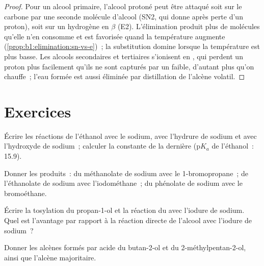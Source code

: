 \begin{proof}
Pour un alcool primaire, l'alcool protoné peut être attaqué soit sur le
carbone par une seconde molécule d'alcool (SN2, qui donne 
après perte d'un proton), soit sur un hydrogène en $\beta$ (E2).
L'élimination produit plus de molécules qu'elle n'en consomme et est
favorisée quand la température augmente
(\cref{prop:b1:elimination:sn-vs-e})~; la substitution domine lorsque la
température est plus basse. Les alcools secondaires et tertiaires
s'ionisent en , qui perdent un proton plus facilement qu'ils
ne sont capturés par un  faible, d'autant plus qu'on chauffe~;
l'eau formée est aussi éliminée par distillation de l'alcène volatil.
\end{proof}

\section{Exercices}

\begin{exercise}[$\star$]\label{exo:b1:alcohol-activation:1}
Écrire les réactions de l'éthanol avec le sodium, avec l'hydrure de
sodium et avec l'hydroxyde de sodium~; calculer la constante de la
dernière ($\mathrm{p}K_a$ de l'éthanol~: 15.9).
\end{exercise}

\begin{exercise}[$\star$]\label{exo:b1:alcohol-activation:2}
Donner les produits~: du méthanolate de sodium avec le 1-bromopropane~;
de l'éthanolate de sodium avec l'iodométhane~; du phénolate de sodium
avec le bromoéthane.
\end{exercise}

\begin{exercise}[$\star$]\label{exo:b1:alcohol-activation:3}
Écrire la tosylation du propan-1-ol et la réaction du  avec
l'iodure de sodium. Quel est l'avantage par rapport à la réaction
directe de l'alcool avec l'iodure de sodium~?
\end{exercise}

\begin{exercise}[$\star$]\label{exo:b1:alcohol-activation:4}
Donner les alcènes formés par  acide du butan-2-ol et du
2-méthylpentan-2-ol, ainsi que l'alcène majoritaire.
\end{exercise}

